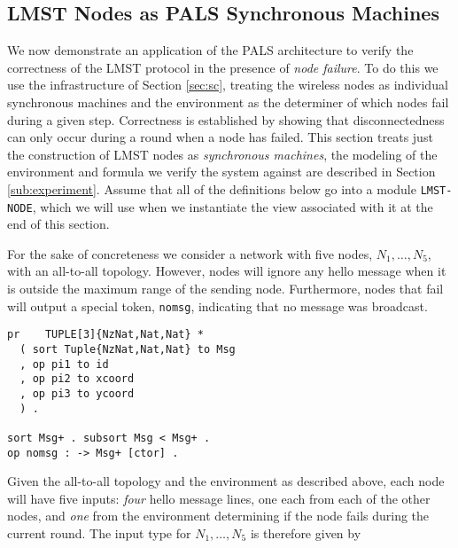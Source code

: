 \documentclass[copyright,creativecommons]{eptcs}
\begin{document}
\subsection{LMST Nodes as PALS Synchronous Machines} 
\label{sub:lmstToSMs}



We now demonstrate an application of the PALS architecture to verify the
correctness of the LMST protocol in the presence of \emph{node failure}.  To do
this we use the infrastructure of Section \ref{sec:sc}, treating the wireless
nodes as individual synchronous machines and the environment as the determiner
of which nodes fail during a given step. Correctness is established by showing
that disconnectedness can only occur during a round when a node has failed.
This section treats just the construction of LMST nodes as \emph{synchronous
machines}, the modeling of the environment and formula we verify the system
against are described in Section \ref{sub:experiment}. Assume that all of the
definitions below go into a module {\tt LMST-NODE}, which we will use when we
instantiate the view associated with it at the end of this section.

For the sake of concreteness we consider a network with five nodes,
$N_1,\dotsc,N_5$, with an all-to-all topology. However, nodes will ignore any
hello message when it is outside the maximum range of the sending node.
Furthermore, nodes that fail will output a special token, {\tt nomsg},
indicating that no message was broadcast. 

\begin{center}
\begin{small}
\begin{boxedminipage}{0.50\textwidth}
\begin{verbatim}
pr    TUPLE[3]{NzNat,Nat,Nat} *
  ( sort Tuple{NzNat,Nat,Nat} to Msg 
  , op pi1 to id
  , op pi2 to xcoord
  , op pi3 to ycoord
  ) .

sort Msg+ . subsort Msg < Msg+ .
op nomsg : -> Msg+ [ctor] .
\end{verbatim}
\end{boxedminipage}
\end{small}
\end{center}

Given the all-to-all topology and the environment as described above, each node
will have five inputs: \emph{four} hello message lines, one each from each of
the other nodes, and \emph{one} from the environment determining if the node
fails during the current round. The input type for $N_1,\dotsc,N_5$ is
therefore given by
\end{document}
